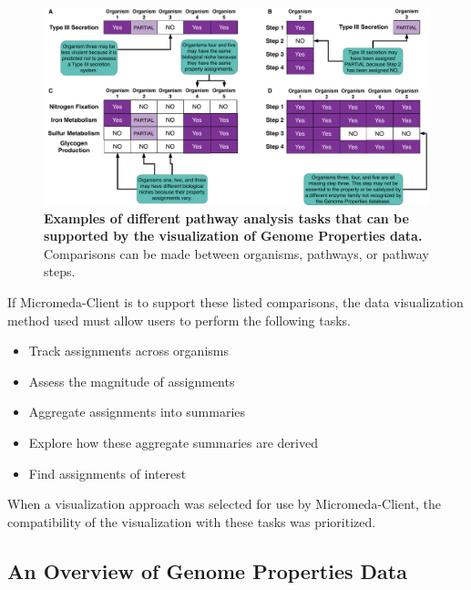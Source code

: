 \begin{figure}[!ht]
  \centering
	\includegraphics[width=\textwidth]{media/analysis_types.pdf}
	 \caption[Examples of different pathway analysis tasks that can be supported by 
the visualization of Genome Properties data.]{\textbf{Examples of different 
pathway analysis tasks that can be supported by the visualization of Genome 
Properties data.} Comparisons can be made between 
organisms, pathways, or pathway steps.}
	 \label{fig:client-analysis-types}
\end{figure}

If Micromeda-Client is to support these listed comparisons, the data visualization 
method used must allow users to perform the following tasks.

\begin{itemize}
\item Track assignments across organisms
\item Assess the magnitude of assignments
\item Aggregate assignments into summaries
\item Explore how these aggregate summaries are derived
\item Find assignments of interest
\end{itemize}

When a visualization approach was selected for use by Micromeda-Client, the 
compatibility of the visualization with these tasks was prioritized.

\subsection{An Overview of Genome Properties Data}

